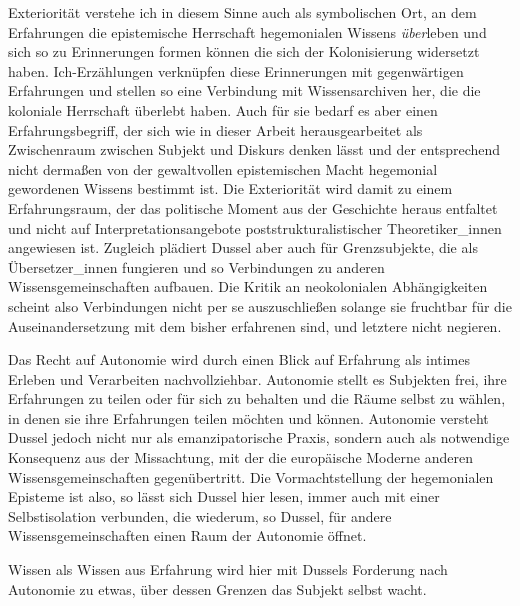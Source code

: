 Exteriorität verstehe ich in diesem Sinne auch als symbolischen Ort, an dem
Erfahrungen die epistemische Herrschaft hegemonialen Wissens \textit{über}leben und sich
so zu Erinnerungen formen können die sich der Kolonisierung widersetzt haben.
Ich-Erzählungen verknüpfen diese Erinnerungen mit gegenwärtigen Erfahrungen und
stellen so eine Verbindung mit Wissensarchiven her, die die koloniale Herrschaft
überlebt haben. Auch für sie bedarf es aber einen Erfahrungsbegriff, der sich
wie in dieser Arbeit herausgearbeitet als Zwischenraum zwischen Subjekt und
Diskurs denken lässt und der entsprechend nicht dermaßen von der gewaltvollen
epistemischen Macht hegemonial gewordenen Wissens bestimmt ist. Die Exteriorität
wird damit zu einem Erfahrungsraum, der das politische Moment aus der Geschichte
heraus entfaltet und nicht auf Interpretationsangebote poststrukturalistischer
Theoretiker\_innen angewiesen ist. Zugleich plädiert Dussel aber auch für
Grenzsubjekte, die als Übersetzer\_innen fungieren und so Verbindungen zu anderen
Wissensgemeinschaften aufbauen. Die Kritik an neokolonialen Abhängigkeiten
scheint also Verbindungen nicht per se auszuschließen solange sie fruchtbar für
die Auseinandersetzung mit dem bisher erfahrenen sind, und letztere nicht
negieren.  

Das Recht auf Autonomie wird durch einen Blick auf Erfahrung als intimes Erleben
und Verarbeiten nachvollziehbar. Autonomie stellt es Subjekten frei, ihre
Erfahrungen zu teilen oder für sich zu behalten und die Räume selbst zu wählen,
in denen sie ihre Erfahrungen teilen möchten und können. Autonomie versteht
Dussel jedoch nicht nur als emanzipatorische Praxis, sondern auch als notwendige
Konsequenz aus der Missachtung, mit der die europäische Moderne anderen
Wissensgemeinschaften gegenübertritt. Die Vormachtstellung der hegemonialen
Episteme ist also, so lässt sich Dussel hier lesen, immer auch mit einer
Selbstisolation verbunden, die wiederum, so Dussel, für andere Wissensgemeinschaften einen Raum der Autonomie öffnet.

Wissen als Wissen aus Erfahrung wird hier mit Dussels Forderung nach Autonomie zu etwas, über dessen Grenzen das Subjekt selbst wacht.

